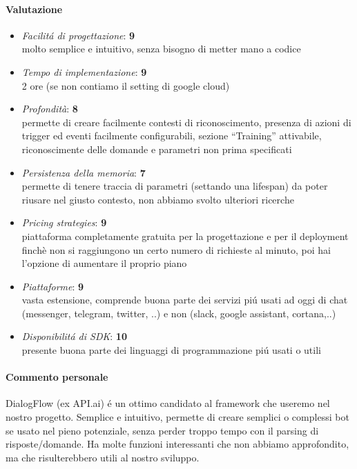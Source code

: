 \documentclass[]{article}
\begin{document}
\paragraph{Valutazione}
\begin{itemize}
\item \textit{Facilitá di progettazione}: \textbf{9} \\ molto semplice e intuitivo, senza bisogno di metter mano a codice

\item \textit{Tempo di implementazione}: \textbf{9} \\ 2 ore (se non contiamo il setting di google cloud)  

\item \textit{Profondità}: \textbf{8} \\  permette di creare facilmente contesti di riconoscimento, presenza di azioni di trigger ed eventi facilmente configurabili, sezione “Training” attivabile, riconoscimente delle domande e parametri non prima specificati
\item \textit{Persistenza della memoria}: \textbf{7} \\ permette di tenere traccia di parametri (settando una lifespan) da poter riusare nel giusto contesto, non abbiamo svolto ulteriori ricerche
\item \textit{Pricing strategies}: \textbf{9} \\ piattaforma completamente gratuita per la progettazione e per il deployment finchè non si raggiungono un certo numero di richieste al minuto, poi hai l’opzione di aumentare il proprio piano

\item \textit{Piattaforme}: \textbf{9} \\ vasta estensione, comprende buona parte dei servizi piú usati ad oggi di chat (messenger, telegram, twitter, ..) e non (slack, google assistant, cortana,..) 
\item \textit{Disponibilitá di SDK}: \textbf{10} \\  presente buona parte dei linguaggi di programmazione piú usati o utili
\end{itemize}

\paragraph{Commento personale}
DialogFlow (ex API.ai) é un ottimo candidato al framework che useremo nel nostro progetto. Semplice e intuitivo, permette di creare semplici o complessi bot se usato nel pieno potenziale, senza perder troppo tempo con il parsing di risposte/domande. Ha molte funzioni interessanti che non abbiamo approfondito, ma che risulterebbero utili al nostro sviluppo. 
\end{document}
